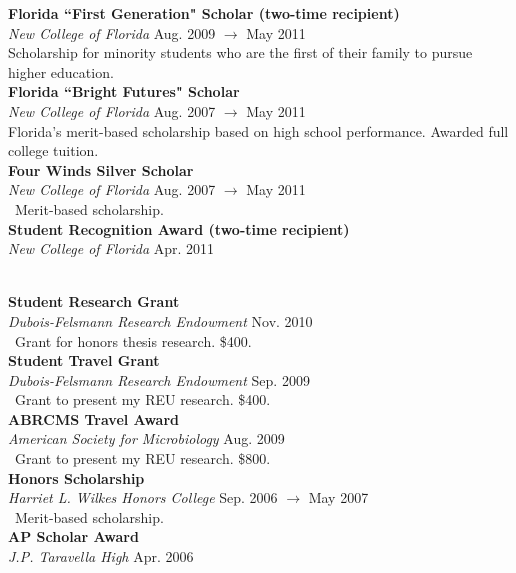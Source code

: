 \documentclass[a4paper,12pt]{article}
\newcommand{\ressubheading}[4]{
        \textbf{#1} \hfill #2\\
        \textit{#3} \hfill #4 \\}
\begin{document}
    \ressubheading{Florida ``First Generation" Scholar {\normalfont(two-time recipient)}}{}{New College of Florida}{Aug. 2009 $\rightarrow$ May 2011}
    Scholarship for minority students who are the first of their family to pursue higher education.\\

    \ressubheading{Florida ``Bright Futures" Scholar}{}{New College of Florida}{Aug. 2007 $\rightarrow$ May 2011}
    Florida's merit-based scholarship based on high school performance. Awarded full college tuition. \\

    \ressubheading{Four Winds Silver Scholar}{}{New College of Florida}{Aug. 2007 $\rightarrow$ May 2011}\
    Merit-based scholarship.\\
    
  \ressubheading{Student Recognition Award {\normalfont(two-time recipient)} }{}{New College of Florida} {Apr. 2011}\
    
    \ressubheading{Student Research Grant}{}{Dubois-Felsmann Research Endowment}{Nov. 2010}\
    Grant for honors thesis research. \$400.\\
    
    \ressubheading{Student Travel Grant}{}{Dubois-Felsmann Research Endowment}{Sep. 2009}\
    Grant to present my REU research. \$400.\\
    
    \ressubheading{ABRCMS Travel Award}{}{American Society for Microbiology}{Aug. 2009}\
    Grant to present my REU research. \$800.\\
    
    \ressubheading{Honors Scholarship}{}{Harriet L. Wilkes Honors College}{Sep. 2006 $\rightarrow$ May 2007}\
    Merit-based scholarship.\\
    
    \ressubheading{AP Scholar Award}{}{J.P. Taravella High}{Apr. 2006}
\end{document}
